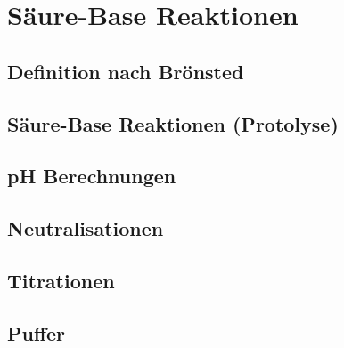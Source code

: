 \section{Säure-Base Reaktionen}

\subsection{Definition nach Brönsted}

\subsection{Säure-Base Reaktionen (Protolyse)}

\subsection{pH Berechnungen}

\subsection{Neutralisationen}

\subsection{Titrationen}

\subsection{Puffer}

